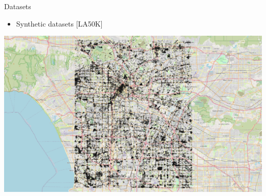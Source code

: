      \begin{frame}{Datasets}
        \begin{itemize} \item Synthetic datasets [LA50K] \end{itemize} \vspace{0.25cm}

         \centering
         \includegraphics[width=\textwidth]{figures/LA_T320_N50K.png}
     \end{frame}


